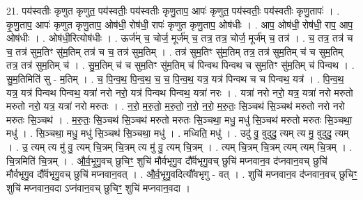\documentclass[17pt]{extarticle}
\begin{document}
21. पय॑स्वतीः कृणुत कृणुत॒ पय॑स्वतीः॒ पय॑स्वतीः कृणु॒ताप॒ आपः॑ कृणुत॒ पय॑स्वतीः॒ पय॑स्वतीः कृणु॒तापः॑ । . कृ॒णु॒ताप॒ आपः॑ कृणुत कृणु॒ताप॒ ओष॑धी॒ रोष॑धी॒ रापः॑ कृणुत कृणु॒ताप॒ ओष॑धीः । . आप॒ ओष॑धी॒ रोष॑धी॒ राप॒ आप॒ ओष॑धीः । . ओष॑धी॒रित्योष॑धीः । . ऊर्ज॑म् च॒ चोर्ज॒ मूर्ज॑म् च॒ तत्र॒ तत्र॒ चोर्ज॒ मूर्ज॑म् च॒ तत्र॑ । . च॒ तत्र॒ तत्र॑ च च॒ तत्र॑ सुम॒तिꣳ सु॑म॒तिम् तत्र॑ च च॒ तत्र॑ सुम॒तिम् । . तत्र॑ सुम॒तिꣳ सु॑म॒तिम् तत्र॒ तत्र॑ सुम॒तिम् च॑ च सुम॒तिम् तत्र॒ तत्र॑ सुम॒तिम् च॑ । . सु॒म॒तिम् च॑ च सुम॒तिꣳ सु॑म॒तिम् च॑ पिन्वथ पिन्वथ च सुम॒तिꣳ सु॑म॒तिम् च॑ पिन्वथ । . सु॒म॒तिमिति॑ सु - म॒तिम् । . च॒ पि॒न्व॒थ॒ पि॒न्व॒थ॒ च॒ च॒ पि॒न्व॒थ॒ यत्र॒ यत्र॑ पिन्वथ च च पिन्वथ॒ यत्र॑ । . पि॒न्व॒थ॒ यत्र॒ यत्र॑ पिन्वथ पिन्वथ॒ यत्रा॑ नरो नरो॒ यत्र॑ पिन्वथ पिन्वथ॒ यत्रा॑ नरः । . यत्रा॑ नरो नरो॒ यत्र॒ यत्रा॑ नरो मरुतो मरुतो नरो॒ यत्र॒ यत्रा॑ नरो मरुतः । . न॒रो॒ म॒रु॒तो॒ म॒रु॒तो॒ न॒रो॒ न॒रो॒ म॒रु॒तः॒ सि॒ञ्चथ॑ सि॒ञ्चथ॑ मरुतो नरो नरो मरुतः सि॒ञ्चथ॑ । . म॒रु॒तः॒ सि॒ञ्चथ॑ सि॒ञ्चथ॑ मरुतो मरुतः सि॒ञ्चथा॒ मधु॒ मधु॑ सि॒ञ्चथ॑ मरुतो मरुतः सि॒ञ्चथा॒ मधु॑ । . सि॒ञ्चथा॒ मधु॒ मधु॑ सि॒ञ्चथ॑ सि॒ञ्चथा॒ मधु॑ । . मध्विति॒ मधु॑ । . उदु॑ वु॒ वुदुदु॒ त्यम् त्य मु॒ वुदुदु॒ त्यम् । . उ॒ त्यम् त्य मु॑ वु॒ त्यम् चि॒त्रम् चि॒त्रम् त्य मु॑ वु॒ त्यम् चि॒त्रम् । . त्यम् चि॒त्रम् चि॒त्रम् त्यम् त्यम् चि॒त्रम् । . चि॒त्रमिति॑ चि॒त्रम् । . औ॒र्व॒भृ॒गु॒वच् छुचिꣳ॒॒ शुचि॑ मौर्वभृगु॒व दौ᳚र्वभृगु॒वच् छुचि॑ मप्नवान॒व द॑प्नवान॒वच् छुचि॑ मौर्वभृगु॒व दौ᳚र्वभृगु॒वच् छुचि॑ मप्नवान॒वत् । . औ॒र्व॒भृ॒गु॒वदित्यौ᳚वभृगु - वत् । . शुचि॑ मप्नवान॒व द॑प्नवान॒वच् छुचिꣳ॒॒ शुचि॑ मप्नवान॒वदा ऽप्न॑वान॒वच् छुचिꣳ॒॒ शुचि॑ मप्नवान॒वदा । \newline
\end{document}
